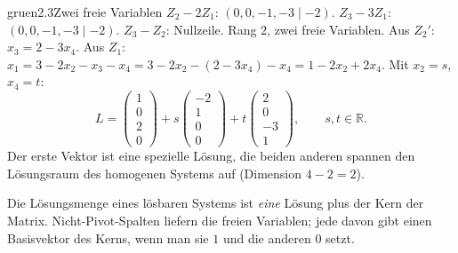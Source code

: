 \begin{loesungkarte}{gruen}{2.3}{Zwei freie Variablen}
$Z_2 - 2Z_1$: $(0, 0, -1, -3\mid -2)$. $Z_3 - 3Z_1$: $(0, 0, -1, -3\mid -2)$. $Z_3 - Z_2$: Nullzeile. Rang $2$, zwei freie Variablen.
Aus $Z_2'$: $x_3 = 2 - 3x_4$. Aus $Z_1$: $x_1 = 3 - 2x_2 - x_3 - x_4 = 3 - 2x_2 - (2 - 3x_4) - x_4 = 1 - 2x_2 + 2x_4$. Mit $x_2 = s$, $x_4 = t$:
\[ L = \begin{pmatrix}1\\ 0\\ 2\\ 0\end{pmatrix} + s\begin{pmatrix}-2\\ 1\\ 0\\ 0\end{pmatrix} + t\begin{pmatrix}2\\ 0\\ -3\\ 1\end{pmatrix},\qquad s, t\in\mathbb R . \]
Der erste Vektor ist eine spezielle Lösung, die beiden anderen spannen den Lösungsraum des homogenen Systems auf (Dimension $4 - 2 = 2$).
\begin{mitnehmen}\kastentext
Die Lösungsmenge eines lösbaren Systems ist \emph{eine} Lösung plus der Kern der Matrix. Nicht-Pivot-Spalten liefern die freien Variablen; jede davon gibt einen Basisvektor des Kerns, wenn man sie $1$ und die anderen $0$ setzt.
\end{mitnehmen}
\end{loesungkarte}

